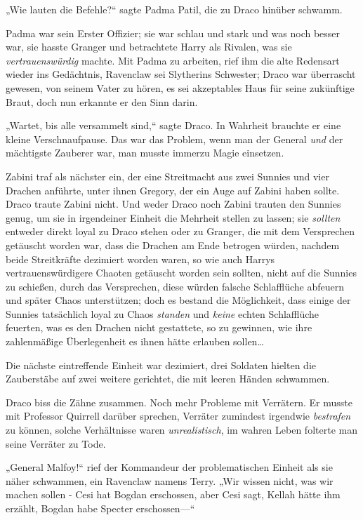 {„Wie lauten die Befehle?“ sagte Padma Patil, die zu Draco hinüber schwamm.

Padma war sein Erster Offizier; sie war schlau und stark und was noch besser war, sie hasste Granger und betrachtete Harry als Rivalen, was sie \emph{vertrauenswürdig} machte. Mit Padma zu arbeiten, rief ihm die alte Redensart wieder ins Gedächtnis, Ravenclaw sei Slytherins Schwester; Draco war überrascht gewesen, von seinem Vater zu hören, es sei akzeptables Haus für seine zukünftige Braut, doch nun erkannte er den Sinn darin.

„Wartet, bis alle versammelt sind,“ sagte Draco. In Wahrheit brauchte er eine kleine Verschnaufpause. Das war das Problem, wenn man der General \emph{und} der mächtigste Zauberer war, man musste immerzu Magie einsetzen.

Zabini traf als nächster ein, der eine Streitmacht aus zwei Sunnies und vier Drachen anführte, unter ihnen Gregory, der ein Auge auf Zabini haben sollte. Draco traute Zabini nicht. Und weder Draco noch Zabini trauten den Sunnies genug, um sie in irgendeiner Einheit die Mehrheit stellen zu lassen; sie \emph{sollten} entweder direkt loyal zu Draco stehen oder zu Granger, die mit dem Versprechen getäuscht worden war, dass die Drachen am Ende betrogen würden, nachdem beide Streitkräfte dezimiert worden waren, so wie auch Harrys vertrauenswürdigere Chaoten getäuscht worden sein sollten, nicht auf die Sunnies zu schießen, durch das Versprechen, diese würden falsche Schlafflüche abfeuern und später Chaos unterstützen; doch es bestand die Möglichkeit, dass einige der Sunnies tatsächlich loyal zu Chaos \emph{standen} und \emph{keine} echten Schlafflüche feuerten, was es den Drachen nicht gestattete, so zu gewinnen, wie ihre zahlenmäßige Überlegenheit es ihnen hätte erlauben sollen…

Die nächste eintreffende Einheit war dezimiert, drei Soldaten hielten die Zauberstäbe auf zwei weitere gerichtet, die mit leeren Händen schwammen.

Draco biss die Zähne zusammen. Noch mehr Probleme mit Verrätern. Er musste mit Professor Quirrell darüber sprechen, Verräter zumindest irgendwie \emph{bestrafen} zu können, solche Verhältnisse waren \emph{unrealistisch}, im wahren Leben folterte man seine Verräter zu Tode.

„General Malfoy!“ rief der Kommandeur der problematischen Einheit als sie näher schwammen, ein Ravenclaw namens Terry. „Wir wissen nicht, was wir machen sollen - Cesi hat Bogdan erschossen, aber Cesi sagt, Kellah hätte ihm erzählt, Bogdan habe Specter erschossen—“

}
